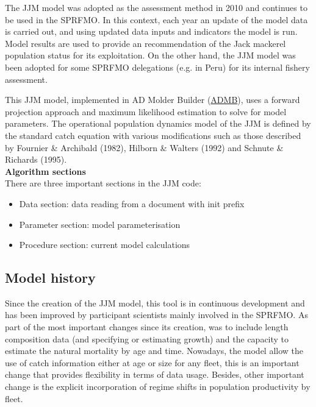 \documentclass{article}
\begin{document}
The JJM model was adopted as the assessment method in 2010 and continues to be used in the SPRFMO. In this context, each year an update of the model data is carried out, and using updated data inputs and indicators the model is run. Model results are used to provide an recommendation of the Jack mackerel population status for its exploitation. On the other hand, the JJM model was been adopted for some SPRFMO delegations (e.g. in Peru) for its internal fishery assessment.

This JJM model, implemented in AD Molder Builder (\href{https://www.admb-project.org/}{ADMB}), uses a forward projection approach and maximum likelihood estimation to solve for model parameters. The operational population dynamics model of the JJM is defined by the standard catch equation with various modifications such as those described by Fournier \& Archibald (1982), Hilborn \& Walters (1992) and Schnute \& Richards (1995).\\

\textbf{Algorithm sections}\\

There are three important sections in the JJM code:

\begin{itemize}
    \item Data section: data reading from a document with init prefix
    \item Parameter section: model parameterisation
    \item Procedure section: current model calculations
\end{itemize}

\subsection{Model history}
Since the creation of the JJM model, this tool is in continuous development and has been improved by participant scientists mainly involved in the SPRFMO. As part of the most important changes since its creation, was to include length composition data (and specifying or estimating growth) and the capacity to estimate the natural mortality by age and time. Nowadays, the model allow the use of catch information either at age or size for any fleet, this is an important change that provides flexibility in terms of data usage. Besides, other important change is the explicit incorporation of regime shifts in population productivity by fleet.
\end{document}
